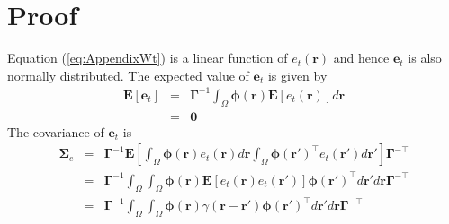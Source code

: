 \documentclass[12pt]{iopart}		%
\begin{document}
\section*{Proof}
 Equation (\ref{eq:AppendixWt}) is a linear function of $e_t(\mathbf r)$ and hence $\mathbf{e}_t$ is also normally distributed. The expected value of $\mathbf e_t$ is given by 
\begin{eqnarray}
 \mathbf E\left[ \mathbf e_t\right]&=& \mathbf{\Gamma}^{-1}\int_{\Omega}\boldsymbol\phi\left(\mathbf{r}\right)\mathbf E\left[e_t\left(\mathbf{r}\right)\right] d\mathbf{r} \nonumber \\
&=&\mathbf 0
\end{eqnarray}
The covariance of $\mathbf{e}_t$ is
\begin{eqnarray}
\mathbf{\Sigma}_e&=&\mathbf{\Gamma}^{-1}\mathbf E[\int_{\Omega}\boldsymbol{\phi}\left(\mathbf{r}\right)e_t\left(\mathbf{r}\right)d\mathbf{r} \int_{\Omega}\boldsymbol{\phi}\left(\mathbf{r}'\right)^{\top} e_t\left(\mathbf{r}'\right)d\mathbf{r}']\mathbf{\Gamma}^{- \top} \nonumber \\
&=&\mathbf{\Gamma}^{-1}\int_{\Omega}\int_{\Omega} \boldsymbol{\phi}\left(\mathbf{r}\right) \mathbf E[e_t\left(\mathbf{r}\right)e_t\left(\mathbf{r}'\right)]\boldsymbol{\phi}\left(\mathbf{r}'\right)^{\top}d\mathbf{r}' d\mathbf r\mathbf{\Gamma}^{- \top} \nonumber\\
&=&\mathbf{\Gamma}^{-1}\int_{\Omega}\int_{\Omega}\boldsymbol{\phi}\left(\mathbf r\right) \gamma\left(\mathbf r- \mathbf r' \right)\boldsymbol{\phi}\left(\mathbf r'\right)^{\top}d\mathbf r' d\mathbf r\mathbf{\Gamma}^{- \top} 
\end{eqnarray}
\end{document}
